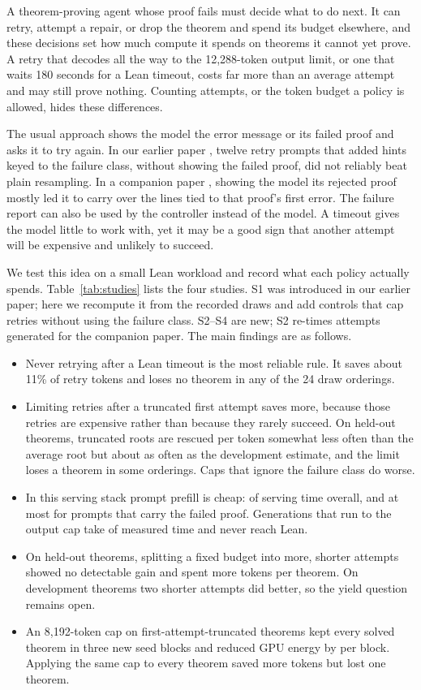 A theorem-proving agent whose proof fails must decide what to do next.  It can retry, attempt a repair, or drop the theorem and spend its budget elsewhere, and these decisions set how much compute it spends on theorems it cannot yet prove.  A retry that decodes all the way to the 12,288-token output limit, or one that waits 180 seconds for a Lean timeout, costs far more than an average attempt and may still prove nothing.  Counting attempts, or the token budget a policy is allowed, hides these differences.

The usual approach shows the model the error message or its failed proof and asks it to try again.  In our earlier paper \citep{reddy2026scheduling}, twelve retry prompts that added hints keyed to the failure class, without showing the failed proof, did not reliably beat plain resampling.  In a companion paper \citep{reddy2026sticky}, showing the model its rejected proof mostly led it to carry over the lines tied to that proof's first error.  The failure report can also be used by the controller instead of the model.  A timeout gives the model little to work with, yet it may be a good sign that another attempt will be expensive and unlikely to succeed.

We test this idea on a small Lean workload and record what each policy actually spends.  Table~\ref{tab:studies} lists the four studies.  S1 was introduced in our earlier paper; here we recompute it from the recorded draws and add controls that cap retries without using the failure class.  S2--S4 are new; S2 re-times attempts generated for the companion paper.  The main findings are as follows.
\begin{itemize}[leftmargin=*,itemsep=1pt,topsep=2pt]
  \item Never retrying after a Lean timeout is the most reliable rule.  It saves about 11\% of retry tokens and loses no theorem in any of the 24 draw orderings.
  \item Limiting retries after a truncated first attempt saves more, because those retries are expensive rather than because they rarely succeed.  On held-out theorems, truncated roots are rescued per token somewhat less often than the average root but about \CrTruncRhoGap{} as often as the development estimate, and the limit loses a theorem in some orderings.  Caps that ignore the failure class do worse.
  \item In this serving stack prompt prefill is cheap: \PrefillServingShare{} of serving time overall, and at most \PrefillArmCShare{} for prompts that carry the failed proof.  Generations that run to the output cap take \TruncatedTotalShare{} of measured time and never reach Lean.
  \item On held-out theorems, splitting a fixed budget into more, shorter attempts showed no detectable gain and spent more tokens per theorem.  On development theorems two shorter attempts did better, so the yield question remains open.
  \item An 8,192-token cap on first-attempt-truncated theorems kept every solved theorem in three new seed blocks and reduced GPU energy by \CapJoulesSavedRange{} per block.  Applying the same cap to every theorem saved more tokens but lost one theorem.
\end{itemize}

